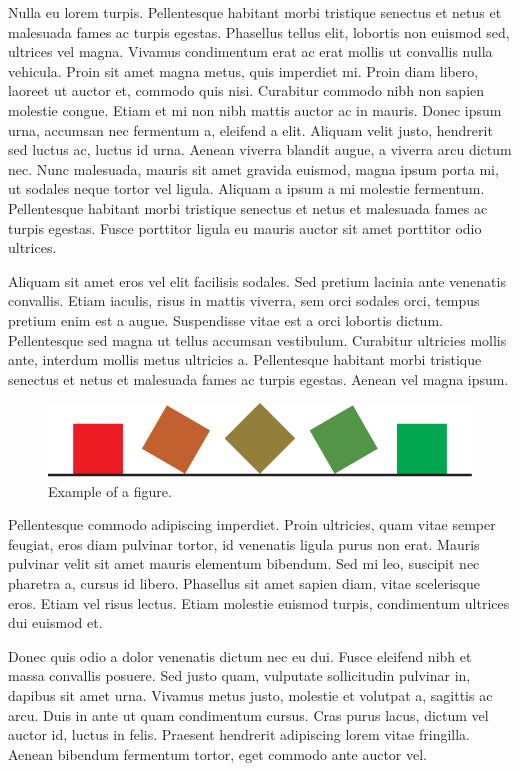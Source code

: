 \documentclass[submission]{gmp2018}
\begin{document}
Nulla eu lorem turpis. Pellentesque habitant morbi tristique senectus et netus et malesuada fames ac turpis egestas. Phasellus tellus elit, lobortis non euismod sed, ultrices vel magna. Vivamus condimentum erat ac erat mollis ut convallis nulla vehicula. Proin sit amet magna metus, quis imperdiet mi. Proin diam libero, laoreet ut auctor et, commodo quis nisi. Curabitur commodo nibh non sapien molestie congue. Etiam et mi non nibh mattis auctor ac in mauris. Donec ipsum urna, accumsan nec fermentum a, eleifend a elit. Aliquam velit justo, hendrerit sed luctus ac, luctus id urna. Aenean viverra blandit augue, a viverra arcu dictum nec. Nunc malesuada, mauris sit amet gravida euismod, magna ipsum porta mi, ut sodales neque tortor vel ligula. Aliquam a ipsum a mi molestie fermentum. Pellentesque habitant morbi tristique senectus et netus et malesuada fames ac turpis egestas. Fusce porttitor ligula eu mauris auctor sit amet porttitor odio ultrices.

Aliquam sit amet eros vel elit facilisis sodales. Sed pretium lacinia ante venenatis convallis. Etiam iaculis, risus in mattis viverra, sem orci sodales orci, tempus pretium enim est a augue. Suspendisse vitae est a orci lobortis dictum. Pellentesque sed magna ut tellus accumsan vestibulum. Curabitur ultricies mollis ante, interdum mollis metus ultricies a. Pellentesque habitant morbi tristique senectus et netus et malesuada fames ac turpis egestas. Aenean vel magna ipsum.

\begin{figure}\centering
  \includegraphics[scale=.8]{example}
  \caption{Example of a figure.}
  \label{fig:square}
\end{figure}

Pellentesque commodo adipiscing imperdiet. Proin ultricies, quam vitae semper feugiat, eros diam pulvinar tortor, id venenatis ligula purus non erat. Mauris pulvinar velit sit amet mauris elementum bibendum. Sed mi leo, suscipit nec pharetra a, cursus id libero. Phasellus sit amet sapien diam, vitae scelerisque eros. Etiam vel risus lectus. Etiam molestie euismod turpis, condimentum ultrices dui euismod et.

Donec quis odio a dolor venenatis dictum nec eu dui. Fusce eleifend nibh et massa convallis posuere. Sed justo quam, vulputate sollicitudin pulvinar in, dapibus sit amet urna. Vivamus metus justo, molestie et volutpat a, sagittis ac arcu. Duis in ante ut quam condimentum cursus. Cras purus lacus, dictum vel auctor id, luctus in felis. Praesent hendrerit adipiscing lorem vitae fringilla. Aenean bibendum fermentum tortor, eget commodo ante auctor vel.
\end{document}
